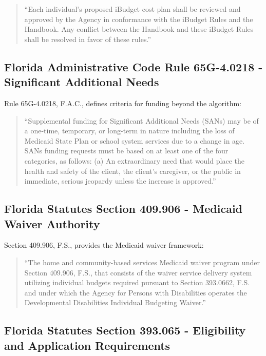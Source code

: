 \begin{quote}
``Each individual's proposed iBudget cost plan shall be reviewed and approved by the Agency in conformance with the iBudget Rules and the Handbook. Any conflict between the Handbook and these iBudget Rules shall be resolved in favor of these rules.''
\end{quote}

\subsection{Florida Administrative Code Rule 65G-4.0218 - Significant Additional Needs}

Rule 65G-4.0218, F.A.C., defines criteria for funding beyond the algorithm:

\begin{quote}
``Supplemental funding for Significant Additional Needs (SANs) may be of a one-time, temporary, or long-term in nature including the loss of Medicaid State Plan or school system services due to a change in age. SANs funding requests must be based on at least one of the four categories, as follows: (a) An extraordinary need that would place the health and safety of the client, the client's caregiver, or the public in immediate, serious jeopardy unless the increase is approved.''
\end{quote}

\subsection{Florida Statutes Section 409.906 - Medicaid Waiver Authority}

Section 409.906, F.S., provides the Medicaid waiver framework:

\begin{quote}
``The home and community-based services Medicaid waiver program under Section 409.906, F.S., that consists of the waiver service delivery system utilizing individual budgets required pursuant to Section 393.0662, F.S. and under which the Agency for Persons with Disabilities operates the Developmental Disabilities Individual Budgeting Waiver.''
\end{quote}

\subsection{Florida Statutes Section 393.065 - Eligibility and Application Requirements}

